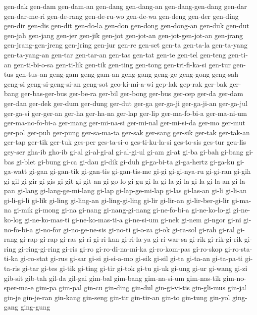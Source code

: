 {gen-dak gen-dam gen-dam-an gen-dang gen-dang-an gen-dang-gen-dang gen-dar
gen-dar-me-ri gen-de-rang gen-de-ru-wo gen-de-wa gen-deng gen-der gen-ding
gen-dir gen-dis gen-dit gen-do-la gen-don gen-dong gen-dong-an gen-duk
gen-dut gen-jah gen-jang gen-jer gen-jik gen-jot gen-jot-an
gen-jot-gen-jot-an gen-jrang gen-jrang-gen-jreng gen-jring gen-jur gen-re
gen-set gen-ta gen-ta-la gen-ta-yang gen-ta-yang-an gen-tar gen-tar-an
gen-tas gen-tat gen-te gen-tel gen-teng gen-ti-an gen-ti-bi-o-sa
gen-ti-lik gen-tik gen-ting gen-tong gen-tri-fi-ka-si gen-tur gen-tus
gen-tus-an geng-gam geng-gam-an geng-gang geng-ge geng-gong geng-sah
geng-si geng-si-geng-si-an geng-sot geo-ki-mi-a-wi gep-lak gep-rak ger-bak
ger-bang ger-bas-ger-bus ger-be-ra ger-bil ger-bong ger-bus ger-cep ger-da
ger-dam ger-dan ger-dek ger-dum ger-dung ger-dut ger-ga ger-ga-ji
ger-ga-ji-an ger-ga-jul ger-ga-si ger-ger-an ger-ha ger-ha-na ger-lap
ger-lip ger-ma-fo-bi-a ger-ma-ni-um ger-ma-no-fo-bi-a ger-mang
ger-mi-na-si ger-mi-nal ger-mi-si-da ger-mo ger-mut ger-pol ger-puh
ger-pung ger-sa-ma-ta ger-sak ger-sang ger-sik ger-tak ger-tak-an ger-tap
ger-tik ger-tuk ges-per ges-ta-si-o ges-ti-ku-la-si ges-to-sis ges-tur
geu-lis gey-ser gha-ib gho-ib gi-al gi-al-gi-al gi-al-gi-ul gi-am gi-at
gi-ba gi-bah gi-bang gi-bas gi-blet gi-bung gi-ca gi-dau gi-dik gi-duh
gi-ga-bi-ta gi-ga-hertz gi-ga-ku gi-ga-watt gi-gan gi-gan-tik gi-gan-tis
gi-gan-tis-me gi-gi gi-gi-nya-ru gi-gi-ran gi-gih gi-gil gi-gir gi-gis
gi-git gi-git-an gi-go-lo gi-gu gi-la gi-la-gi-la gi-la-gi-la-an gi-la-pan
gi-lang gi-lang-ge-mi-lang gi-lap gi-lap-ge-mi-lap gi-las gi-las-an gi-li
gi-li-an gi-li-gi-li gi-lik gi-ling gi-ling-an gi-ling-gi-ling gi-lir
gi-lir-an gi-lir-ber-gi-lir gi-ma-na gi-mik gi-mong gi-na gi-nang
gi-nang-gi-nang gi-ne-fo-bi-a gi-ne-ko-lo-gi gi-ne-ko-log gi-ne-ko-mas-ti
gi-ne-ko-mas-ti-a gi-ne-si-um gi-nek gi-nem gi-ngor gi-ni gi-no-fo-bi-a
gi-no-for gi-no-ge-ne-sis gi-no-ti gi-o-za gi-ok gi-ra-sol gi-rah gi-ral
gi-rang gi-rap-gi-rap gi-ras gi-ri gi-ri-kan gi-ri-la-ya gi-ri-war-sa
gi-rik gi-rik-gi-rik gi-ring gi-ring-gi-ring gi-ris gi-ro
gi-ro-di-na-mi-ka gi-ro-kom-pas gi-ro-skop gi-ro-sta-ti-ka gi-ro-stat
gi-rus gi-sar gi-si gi-si-a-mo gi-sik gi-sil gi-ta gi-ta-an gi-ta-pa-ti
gi-ta-ris gi-tar gi-tes gi-tik gi-ting gi-tir gi-tok gi-tu gi-uk gi-ung
gi-ur gi-wang gi-zi gib-sit gib-tah gil-da gil-gai gim-bal gim-bang
gim-na-si-um gim-nas-tik gim-no-sper-ma-e gim-pa gim-pal gin-cu gin-ding
gin-dul gin-gi-vi-tis gin-gli-mus gin-jal gin-je gin-je-ran gin-kang
gin-seng gin-tir gin-tir-an gin-to gin-tung gin-yol ging-gang ging-gung
}
